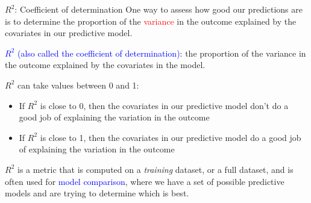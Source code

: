 \documentclass[10pt,t]{beamer}
\begin{document}
\begin{frame}{$R^2$: Coefficient of determination}
	\vspace{-0.4cm}
One way to assess how good our predictions are is to determine the proportion of the \textcolor{red}{variance} in the outcome explained by the covariates in our predictive model.

\vspace{0.3cm}

\textcolor{blue}{$R^2$ (also called the coefficient of determination)}: the proportion of the variance in the outcome explained by the covariates in the model. 

\vspace{0.3cm}

$R^2$ can take values between 0 and 1:

\vspace{0.3cm}

\begin{itemize}
	\item If $R^2$ is close to 0, then the covariates in our predictive model don't do a good job of explaining the variation in the outcome
	\item If $R^2$ is close to 1, then the covariates in our predictive model do a good job of explaining the variation in the outcome
\end{itemize}

\vspace{0.2cm}

$R^2$ is a metric that is computed on a \textit{training} dataset, or a full dataset, and is often used for \textcolor{blue}{model comparison}, where we have a set of possible predictive models and are trying to determine which is best.
\end{frame}
\end{document}

